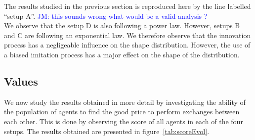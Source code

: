 \documentclass{wscpaperproc}
\newcommand{\memo}[2]{\textcolor{#1}{#2}}
\newcommand{\jm}[1]{\memo{blue}{JM: #1\\}}
\begin{document}

The results studied in the previous section is reproduced here by the line labelled ``setup A''. 
\jm{this sounds wrong what would be a valid analysis ?}
We observe that the setup D is also following a power law. However, setups B and C are following an exponential law. We therefore observe that the innovation process has a negligeable influence on the shape distribution. However, the use of a biased imitation process has a major effect on the shape of the distribution.



\subsection{Values}

We now study the results obtained in more detail by investigating the ability of the population of agents to find the good price to perform exchanges between each other. This is done by observing the score of all agents in each of the four setups. The results obtained are presented in figure~\ref{tab:scoreEvol}.
\end{document}
